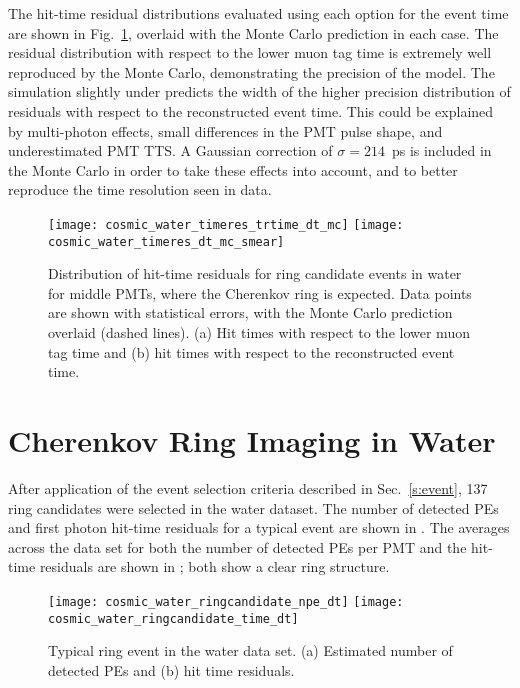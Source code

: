 The hit-time residual distributions evaluated using each option for the event time are shown in Fig.~\ref{f:smear}, 
overlaid with the Monte Carlo prediction in each case.  
The residual distribution with respect to the lower muon tag time is extremely well reproduced by the Monte Carlo, demonstrating the precision of the model.  The simulation slightly under predicts the width of the higher precision distribution of residuals with respect to the reconstructed event time.  This could be explained by multi-photon effects, small differences in the PMT pulse shape, and underestimated PMT TTS.  
A Gaussian correction of $\sigma=214$~ps is included in the Monte Carlo in order to take these effects into account, and to better reproduce the time resolution seen in data. 

\begin{figure}
	\centering
	\texttt{[image: cosmic\_water\_timeres\_trtime\_dt\_mc]}
	\texttt{[image: cosmic\_water\_timeres\_dt\_mc\_smear]}
	\caption{Distribution of hit-time residuals 
	for ring candidate events in water for middle PMTs, where the Cherenkov ring is expected. Data points are shown with statistical errors, with the Monte Carlo prediction overlaid (dashed lines). 
	(a) Hit times with respect to the lower muon tag time and (b) hit times with respect to the reconstructed event time.}
	\label{f:smear}
\end{figure}

\section{Cherenkov Ring Imaging in Water}

After application of the event selection criteria described in Sec.~\ref{s:event}, 137 ring candidates were selected in the water dataset.  The number of detected PEs and first photon hit-time residuals for a typical event are shown in . The averages across the data set for both the number of detected PEs per PMT and the hit-time residuals are shown in ; both show a clear ring structure. 


\begin{figure}
	\centering
	\texttt{[image: cosmic\_water\_ringcandidate\_npe\_dt]}
	\texttt{[image: cosmic\_water\_ringcandidate\_time\_dt]}
	\caption{Typical ring event in the water data set. (a) Estimated number of detected PEs and (b) hit time residuals.}
	\label{fig:cosmics_water_ring_candidate}
\end{figure}


